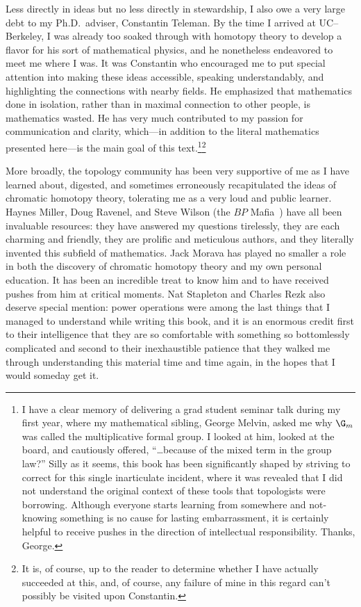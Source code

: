 Less directly in ideas but no less directly in stewardship, I also owe a very large debt to my Ph.D.\ adviser, Constantin Teleman.  By the time I arrived at UC--Berkeley, I was already too soaked through with homotopy theory to develop a flavor for his sort of mathematical physics, and he nonetheless endeavored to meet me where I was.  It was Constantin who encouraged me to put special attention into making these ideas accessible, speaking understandably, and highlighting the connections with nearby fields.  He emphasized that mathematics done in isolation, rather than in maximal connection to other people, is mathematics wasted.  He has very much contributed to my passion for communication and clarity, which---in addition to the literal mathematics presented here---is the main goal of this text.\footnote{I have a clear memory of delivering a grad student seminar talk during my first year, where my mathematical sibling, George Melvin, asked me why $\G_m$ was called the multiplicative formal group.  I looked at him, looked at the board, and cautiously offered, ``\ldots because of the mixed term in the group law?''  Silly as it seems, this book has been significantly shaped by striving to correct for this single inarticulate incident, where it was revealed that I did not understand the original context of these tools that topologists were borrowing.  Although everyone starts learning from somewhere and not-knowing something is no cause for lasting embarrassment, it is certainly helpful to receive pushes in the direction of intellectual responsibility.  Thanks, George.}\footnote{It is, of course, up to the reader to determine whether I have actually succeeded at this, and, of course, any failure of mine in this regard can't possibly be visited upon Constantin.}

More broadly, the topology community has been very supportive of me as I have learned about, digested, and sometimes erroneously recapitulated the ideas of chromatic homotopy theory, tolerating me as a very loud and public learner.  Haynes Miller, Doug Ravenel, and Steve Wilson (the $BP$ Mafia~\cite{HopkinsOnRavenel}) have all been invaluable resources: they have answered my questions tirelessly, they are each charming and friendly, they are prolific and meticulous authors, and they literally invented this subfield of mathematics.  Jack Morava has played no smaller a role in both the discovery of chromatic homotopy theory and my own personal education.  It has been an incredible treat to know him and to have received pushes from him at critical moments.  Nat Stapleton and Charles Rezk also deserve special mention: power operations were among the last things that I managed to understand while writing this book, and it is an enormous credit first to their intelligence that they are so comfortable with something so bottomlessly complicated and second to their inexhaustible patience that they walked me through understanding this material time and time again, in the hopes that I would someday get it.

